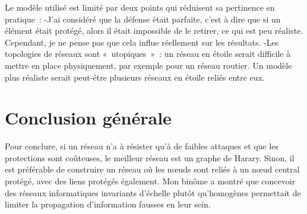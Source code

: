 \documentclass[12pt,a4paper]{article}
\begin{document}
Le modèle utilisé est limité par deux points qui réduisent sa pertinence en pratique :
	-J'ai considéré que la défense était parfaite, c'est à dire que si un élément était protégé, alors il était impossible de le retirer, ce qui est peu réaliste.  Cependant, je ne pense pas que cela influe réellement sur les résultats.
	-Les topologies de réseaux sont « utopiques » : un réseau en étoile serait difficile à mettre en place physiquement, par exemple pour un réseau routier. Un modèle plus réaliste serait peut-être plusieurs réseaux en étoile reliés entre eux.
	
\section{Conclusion générale}
Pour conclure, si un réseau n'a à résister qu'à de faibles attaques et que les protections sont coûteuses,  le meilleur réseau est un graphe de Harary. Sinon, il est préférable de construire un réseau où les nœuds sont reliés à un nœud central protégé, avec des liens protégés également. Mon binôme a montré que concevoir des réseaux informatiques invariants d'échelle plutôt qu'homogènes permettait de limiter la propagation d'information fausses en leur sein.
\end{document}
